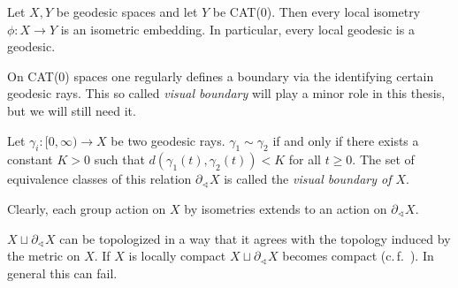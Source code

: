 \begin{prop}
  Let \(X,Y\) be geodesic spaces and let \(Y\) be CAT(0). Then every local isometry \(\phi \colon X \to Y\) is an isometric embedding. In particular, every local geodesic is a geodesic.
\end{prop}

On CAT(0) spaces one regularly defines a boundary via the identifying certain geodesic rays. This so called \emph{visual boundary} will play a minor role in this thesis, but we will still need it. 

\begin{defin}
  Let \(\gamma_i \colon [0, \infty) \to X\) be two geodesic rays. \(\gamma_1 \sim \gamma_2\) if and only if there exists a constant \(K > 0 \) such that \(d(\gamma_1(t), \gamma_2(t)) < K\) for all \(t \geq 0\). The set of equivalence classes of this relation \(\partial_\sphericalangle X\) is called the \emph{visual boundary of \(X\)}.

  Clearly, each group action on \(X\) by isometries extends to an action on \(\partial_\sphericalangle X\).
\end{defin}

\begin{rem}
  \(X \sqcup \partial_{\sphericalangle}X\) can be topologized in a way that it agrees with the topology induced by the metric on \(X\). If \(X\) is locally compact \(X \sqcup \partial_\sphericalangle X\) becomes compact (c.\,f.~\cite[Sec.~II.8]{MR1744486}). In general this can fail.
\end{rem}

\begin{bsp}
\end{bsp}




